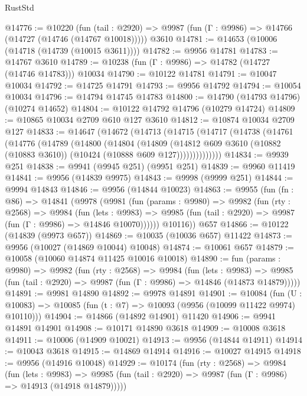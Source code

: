 \begin{lexlean}{RustStd}
\begin{coremodule}
@14776 := @10220
    (fun (tail : @2920) => @9987 (fun (Γ : @9986) => @14766 (@14727 (@14746 (@14767 @10018)))))
    @3610
@14781 := @14653 (@10006 (@14718 (@14739 (@10015 @3611))))
@14782 := @9956 @14781
@14783 := @14767 @3610
@14789 := @10238 (fun (Γ : @9986) => @14782 (@14727 (@14746 @14783))) @10034
@14790 := @10122 @14781
@14791 := @10047 @10034
@14792 := @14725 @14791
@14793 := @9956 @14792
@14794 := @10054 @10034
@14796 := @14794 @14745 @14783
@14800 := @14790 (@14793 @14796) (@10274 @14652)
@14804 := @10122 @14792 @14796 (@10279 @14724)
@14809 := @10865 @10034 @2709 @610 @127 @3610
@14812 := @10874 @10034 @2709 @127
@14833 := @14647
    (@14672
      (@14713
        (@14715
          (@14717
            (@14738
              (@14761
                (@14776
                  (@14789
                    (@14800
                      (@14804
                        (@14809
                          (@14812
                            @609
                            @3610
                            (@10882 (@10883 @3610))
                            (@10424 (@10888 @609 @127))))))))))))))
@14834 := @9939 @251
@14838 := @9941 (@9945 @251) (@9951 @251)
@14839 := @9960 @11419
@14841 := @9956 (@14839 @9975)
@14843 := @9998 (@9999 @251)
@14844 := @9994 @14843
@14846 := @9956 (@14844 @10023)
@14863 := @9955
    (fun (fn : @86) =>
    @14841
      (@9978
        (@9981
          (fun (params : @9980) =>
          @9982
            (fun (rty : @2568) =>
            @9984
              (fun (lets : @9983) =>
              @9985 (fun (tail : @2920) => @9987 (fun (Γ : @9986) => @14846 @10070))))))
        @10116))
    @657
@14866 := @10122 (@14839 (@9973 @657))
@14869 := @10035 (@10036 @657) @11422
@14873 := @9956 (@10027 (@14869 @10044) @10048)
@14874 := @10061 @657
@14879 := @10058 (@10060 @14874 @11425 @10016 @10018)
@14890 := fun (params : @9980) =>
  @9982
    (fun (rty : @2568) =>
    @9984
      (fun (lets : @9983) =>
      @9985 (fun (tail : @2920) => @9987 (fun (Γ : @9986) => @14846 (@14873 @14879)))))
@14891 := @9981 @14890
@14892 := @9978 @14891
@14901 := @10084
    (fun (U : @10083) => @10085 (fun (t : @7) => @10093 (@9956 (@10099 @11422 @9974) @10110)))
@14904 := @14866 (@14892 @14901) @11420
@14906 := @9941 @14891 @14901
@14908 := @10171 @14890 @3618
@14909 := @10008 @3618
@14911 := @10006 (@14909 @10021)
@14913 := @9956 (@14844 @14911)
@14914 := @10043 @3618
@14915 := @14869 @14914
@14916 := @10027 @14915
@14918 := @9956 (@14916 @10048)
@14929 := @10174
    (fun (rty : @2568) =>
    @9984
      (fun (lets : @9983) =>
      @9985 (fun (tail : @2920) => @9987 (fun (Γ : @9986) => @14913 (@14918 @14879)))))

\end{coremodule}
\end{lexlean}
